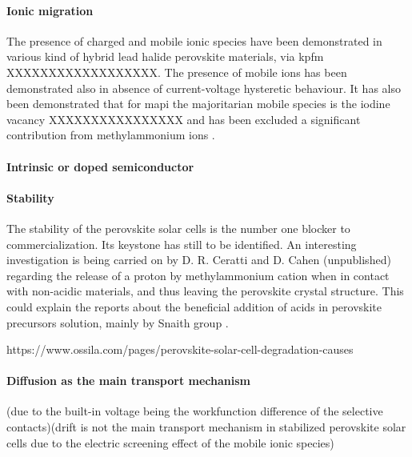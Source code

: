 	\paragraph{Ionic migration}
	The presence of charged and mobile ionic species have been demonstrated in various kind of hybrid lead halide perovskite materials, via \gls{kpfm} \cite{Birkhold2018} XXXXXXXXXXXXXXXXXX. The presence of mobile ions has been demonstrated also in absence of current-voltage hysteretic behaviour\cite{Calado2016,Jacobs2018}. It has also been demonstrated that for \gls{mapi} the majoritarian mobile species is the iodine vacancy XXXXXXXXXXXXXXXX \cite{Senocrate2017} and has been excluded a significant contribution from methylammonium ions \cite{Senocrate2018,Senocrate2017}.

	\paragraph{Intrinsic or doped semiconductor}

	\paragraph{Stability}
	The stability of the perovskite solar cells is the number one blocker to commercialization. Its keystone has still to be identified. An interesting investigation is being carried on by D. R. Ceratti and D. Cahen (unpublished) regarding the release of a proton by methylammonium cation when in contact with non-acidic materials, and thus leaving the perovskite crystal structure. This could explain the reports about the beneficial addition of acids in perovskite precursors solution, mainly by Snaith group \cite{Noel2017,Zhang2015a,Nayak2016}.


https://www.ossila.com/pages/perovskite-solar-cell-degradation-causes

	\paragraph{Diffusion as the main transport mechanism}(due to the built-in voltage being the workfunction difference of the selective contacts)(drift is not the main transport mechanism in stabilized perovskite solar cells due to the electric screening effect of the mobile ionic species)

